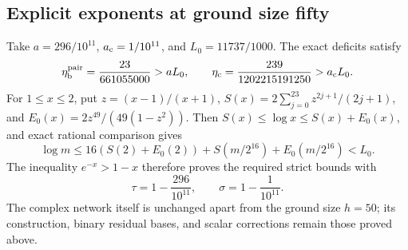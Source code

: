 \subsection{Explicit exponents at ground size fifty}
Take $a=296/10^{11}$, $a_{\rm c}=1/10^{11}$, and $L_0=11737/1000$.
The exact deficits satisfy
\[
 \eta_{\rm b}^{\rm pair}=\frac{23}{661055000}>aL_0,\qquad
 \eta_{\rm c}=\frac{239}{1202215191250}>a_{\rm c}L_0.
\]
For $1\le x\le2$, put $z=(x-1)/(x+1)$,
$S(x)=2\sum_{j=0}^{23}z^{2j+1}/(2j+1)$, and
$E_0(x)=2z^{49}/(49(1-z^2))$. Then
$S(x)\le\log x\le S(x)+E_0(x)$, and exact rational comparison gives
\[
 \log m\le16(S(2)+E_0(2))+S(m/2^{16})+E_0(m/2^{16})<L_0.
\]
The inequality $e^{-x}>1-x$ therefore proves the required strict bounds with
\begin{equation}\label{eq:explicit-motif-exponents}
 \tau=1-\frac{296}{10^{11}},\qquad \sigma=1-\frac1{10^{11}}.
\end{equation}
The complex network itself is unchanged apart from the ground size $h=50$;
its construction, binary residual bases, and scalar corrections remain those
proved above.
